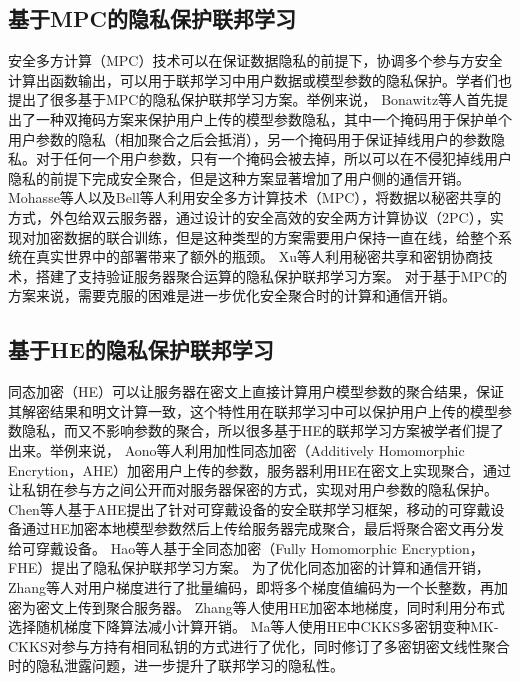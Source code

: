 \subsection{基于MPC的隐私保护联邦学习}
安全多方计算（MPC）技术可以在保证数据隐私的前提下，协调多个参与方安全计算出函数输出，可以用于联邦学习中用户数据或模型参数的隐私保护。学者们也提出了很多基于MPC的隐私保护联邦学习方案\cite{bonawitz2017practical, mohassel2017secureml, mugunthan2019smpai, reich2019privacy, sharma2019secure, so2020scalable, xu2019hybridalpha, zhu2020privacy}。举例来说，
Bonawitz等人\cite{bonawitz2017practical}首先提出了一种双掩码方案来保护用户上传的模型参数隐私，其中一个掩码用于保护单个用户参数的隐私（相加聚合之后会抵消），另一个掩码用于保证掉线用户的参数隐私。对于任何一个用户参数，只有一个掩码会被去掉，所以可以在不侵犯掉线用户隐私的前提下完成安全聚合，但是这种方案显著增加了用户侧的通信开销。
Mohasse等人\cite{mohassel2017secureml}以及Bell等人\cite{bell2020secure}利用安全多方计算技术（MPC），将数据以秘密共享的方式，外包给双云服务器，通过设计的安全高效的安全两方计算协议（2PC），实现对加密数据的联合训练，但是这种类型的方案需要用户保持一直在线，给整个系统在真实世界中的部署带来了额外的瓶颈。
Xu等人\cite{xu2019hybridalpha}利用秘密共享\cite{shamir1979share}和密钥协商技术\cite{hellman1976new}，搭建了支持验证服务器聚合运算的隐私保护联邦学习方案。
对于基于MPC的方案来说，需要克服的困难是进一步优化安全聚合时的计算和通信开销。


\subsection{基于HE的隐私保护联邦学习}
同态加密（HE）可以让服务器在密文上直接计算用户模型参数的聚合结果，保证其解密结果和明文计算一致，这个特性用在联邦学习中可以保护用户上传的模型参数隐私，而又不影响参数的聚合，所以很多基于HE的联邦学习方案\cite{asad2020fedopt, chen2020fedhealth, dong2020eastfly, hao2019efficient, hardy2017private, aono2017privacy, zhang2020batchcrypt, zhang2020privacy, zhao2020smss}被学者们提了出来。举例来说，
Aono等人\cite{aono2017privacy}利用加性同态加密（Additively Homomorphic Encrytion，AHE）加密用户上传的参数，服务器利用HE在密文上实现聚合，通过让私钥在参与方之间公开而对服务器保密的方式，实现对用户参数的隐私保护。
Chen等人\cite{chen2020fedhealth}基于AHE提出了针对可穿戴设备的安全联邦学习框架，移动的可穿戴设备通过HE加密本地模型参数然后上传给服务器完成聚合，最后将聚合密文再分发给可穿戴设备。
Hao等人基于全同态加密（Fully Homomorphic Encryption，FHE）\cite{brakerski2014leveled}提出了隐私保护联邦学习方案。
为了优化同态加密的计算和通信开销，Zhang等人\cite{zhang2020batchcrypt}对用户梯度进行了批量编码，即将多个梯度值编码为一个长整数，再加密为密文上传到聚合服务器。
Zhang等人\cite{zhang2020privacy}使用HE加密本地梯度，同时利用分布式选择随机梯度下降算法减小计算开销。
Ma等人\cite{ma2021privacy}使用HE中CKKS多密钥变种MK-CKKS对参与方持有相同私钥的方式进行了优化，同时修订了多密钥密文线性聚合时的隐私泄露问题，进一步提升了联邦学习的隐私性。


